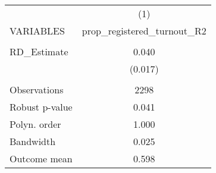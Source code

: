 \documentclass[]{article}
\begin{document}
\begin{tabular}{lc} \hline
 & (1) \\
VARIABLES & prop\_registered\_turnout\_R2 \\ \hline
 &  \\
RD\_Estimate & 0.040 \\
 & (0.017) \\
 &  \\
Observations & 2298 \\
Robust p-value & 0.041 \\
Polyn. order & 1.000 \\
Bandwidth & 0.025 \\
 Outcome mean & 0.598 \\ \hline
\end{tabular}
\end{document}

